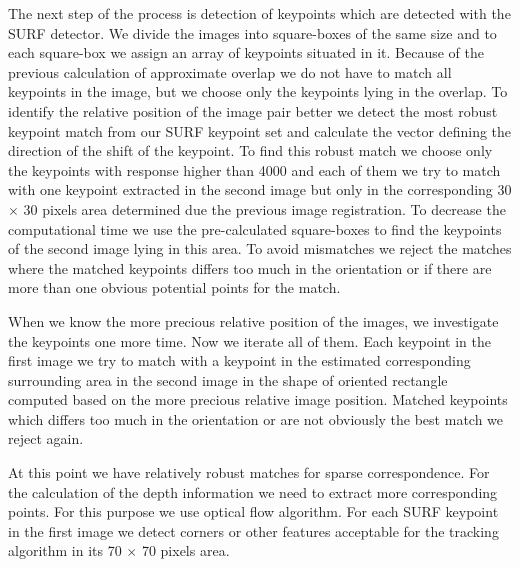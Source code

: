 The next step of the process is detection of keypoints which are detected with the SURF detector.
We divide the images into square-boxes of the same size and to each square-box we assign an array of keypoints situated in it.
Because of the previous calculation of approximate overlap we do not have to match all keypoints in the image, but we choose only the keypoints lying in the overlap.
To identify the relative position of the image pair better we detect the most robust keypoint match from our SURF keypoint set and calculate the vector defining the direction of the shift of the keypoint.
To find this robust match we choose only the keypoints with response higher than 4000 and %
each of them we try to match with one keypoint extracted in the second image but only in the corresponding 30 $\times$ 30 pixels area determined due the previous image registration.
To decrease the computational time we use the pre-calculated square-boxes to find the keypoints of the second image lying in this area.
To avoid mismatches we reject the matches where the matched keypoints differs too much in the orientation or if there are more than one obvious potential points for the match.

When we know the more precious relative position of the images, we investigate the keypoints one more time.
Now we iterate all of them. 
Each keypoint in the first image we try to match with a keypoint in the estimated corresponding surrounding area in the second image in the shape of oriented rectangle computed based on the more precious relative image position.
Matched keypoints which differs too much in the orientation or are not obviously the best match we reject again.

At this point we have relatively robust matches for sparse correspondence. 
For the calculation of the depth information we need to extract more corresponding points.
For this purpose we use optical flow algorithm. 
For each SURF keypoint in the first image we detect corners or other features acceptable for the tracking algorithm in its 70 $\times$ 70 pixels area.

